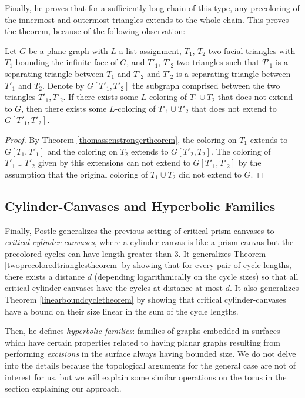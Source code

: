Finally, he proves that for a sufficiently long chain of this type, any precoloring of the innermost and outermost triangles extends to the whole chain. This proves the theorem, because of the following observation:

\begin{proposition}
	Let $G$ be a plane graph with $L$ a list assignment, $T_1$, $T_2$ 
	two facial triangles with $T_1$ bounding the infinite face of $G$, 
	and $T'_1$, $T'_2$ two triangles such that $T'_1$ is a separating 
	triangle between $T_1$ and $T'_2$ and $T'_2$ is a separating 
	triangle between $T'_1$ and $T_2$. Denote by $G[T'_1, T'_2]$ the 
	subgraph comprised between the two triangles $T'_1, T'_2$.  
	If there exists some $L$-coloring of $T_1 \cup T_2$ that does not 
	extend to $G$, then there exists some $L$-coloring of $T'_1 \cup T'_2$ 
	that does not extend to $G[T'_1, T'_2]$.
\end{proposition}

\begin{proof}
	By Theorem \ref{thomassenstrongertheorem}, the coloring on $T_1$ extends to 
	$G[T_1, T'_1]$ and the coloring on $T_2$ extends to $G[T'_2, T_2]$. 
	The coloring of $T'_1 \cup T'_2$ given by this extensions can not 
	extend to $G[T'_1, T'_2]$ by the assumption that the original coloring 
	of $T_1 \cup T_2$ did not extend to $G$.
\end{proof}

\subsection{Cylinder-Canvases and Hyperbolic Families}

Finally, Postle generalizes the previous setting of critical prism-canvases to \emph{critical cylinder-canvases}, where a cylinder-canvas is like a prism-canvas but the precolored cycles can have length
greater than $3$. It generalizes Theorem \ref{twoprecoloredtrianglestheorem} by showing that for
every pair of cycle lengths, there exists a distance $d$ (depending logarithmically on the cycle sizes)
so that all critical cylinder-canvases have the cycles at distance at most $d$. It also generalizes
Theorem \ref{linearboundcycletheorem} by showing that critical cylinder-canvases have a bound
on their size linear in the sum of the cycle lengths.

Then, he defines \emph{hyperbolic families}: families of graphs embedded in surfaces which have
certain properties related to having planar graphs resulting from performing \emph{excisions} in
the surface always having bounded size. We do not delve into the details because the topological
arguments for the general case are not of interest for us, but we will explain some similar
operations on the torus in the section explaining our approach. 

